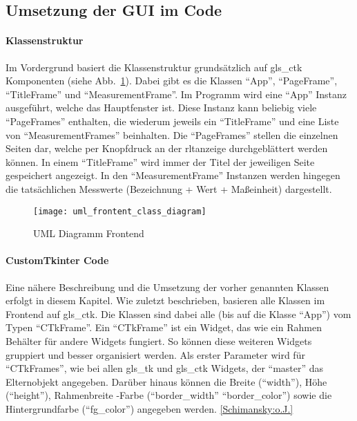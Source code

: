 \subsection{Umsetzung der GUI im Code}\label{tkintercode}
\paragraph{Klassenstruktur}
Im Vordergrund basiert die Klassenstruktur grundsätzlich auf \gls{gls_ctk} Komponenten (siehe Abb.~\ref{fig:klassenstruktur_frontend}). Dabei gibt es die Klassen \enquote{App}, \enquote{PageFrame}, \enquote{TitleFrame} und \enquote{MeasurementFrame}. Im Programm wird eine \enquote{App} Instanz ausgeführt, welche das Hauptfenster ist. Diese Instanz kann beliebig viele \enquote{PageFrames} enthalten, die wiederum jeweils ein \enquote{TitleFrame} und eine Liste von \enquote{MeasurementFrames} beinhalten. Die \enquote{PageFrames} stellen die einzelnen Seiten dar, welche per Knopfdruck an der \acs{rltanzeige} durchgeblättert werden können. In einem \enquote{TitleFrame} wird immer der Titel der jeweiligen Seite gespeichert \bzw angezeigt. In den \enquote{MeasurementFrame} Instanzen werden hingegen die tatsächlichen Messwerte (Bezeichnung + Wert + Maßeinheit) dargestellt.

\begin{figure}[H]
	\centering
	\texttt{[image: uml\_frontent\_class\_diagram]}
	\caption{UML Diagramm Frontend \label{fig:klassenstruktur_frontend}}
\end{figure}

\paragraph{CustomTkinter Code}
Eine nähere Beschreibung und die Umsetzung der vorher genannten Klassen erfolgt in diesem Kapitel. 
\newline Wie zuletzt beschrieben, basieren alle Klassen im Frontend auf \gls{gls_ctk}. Die Klassen sind dabei alle (bis auf die Klasse \enquote{App}) vom Typen \enquote{CTkFrame}. Ein \enquote{CTkFrame} ist ein Widget, das wie ein Rahmen \bzw Behälter für andere Widgets fungiert. So können diese weiteren Widgets gruppiert und besser organisiert werden. Als erster Parameter wird für \enquote{CTkFrames}, wie bei allen \gls{gls_tk} und \gls{gls_ctk} Widgets, der \enquote{master} \bzw das Elternobjekt angegeben. Darüber hinaus können die Breite (\enquote{width}), Höhe (\enquote{height}), Rahmenbreite \bzw -Farbe (\enquote{border\_width} \bzw \enquote{border\_color}) sowie die Hintergrundfarbe (\enquote{fg\_color}) angegeben werden. \ref{Schimansky:o.J.}

